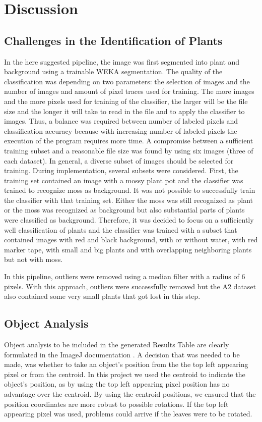 \documentclass[paper=A4,bibliography=totocnumbered]{scrartcl}
\begin{document}
\section{Discussion}
\subsection{Challenges in the Identification of Plants}
In the here suggested pipeline, the image was first segmented into plant and background using a trainable WEKA segmentation. The quality of the classification was depending on two parameters: the selection of images and the number of images and amount of pixel traces used for training. The more images and the more pixels used for training of the classifier, the larger will be the file size and the longer it will take to read in the file and to apply the classifier to images. Thus, a balance was required between number of labeled pixels and classification accuracy because with increasing number of labeled pixels the execution of the program requires more time. A compromise between a sufficient training subset and a reasonable file size was found by using six images (three of each dataset). In general, a diverse subset of images should be selected for training. During implementation, several subsets were considered. First, the training set contained an image with a mossy plant pot and the classifier was trained to recognize moss as background. It was not possible to successfully train the classifier with that training set. Either the moss was still recognized as plant or the moss was recognized as background but also substantial parts of plants were classified as background. Therefore, it was decided to focus on a sufficiently well classification of plants and the classifier was trained with a subset that contained images with red and black background, with or without water, with red marker tape, with small and big plants and with overlapping neighboring plants but not with moss.

In this pipeline, outliers were removed using a median filter with a radius of 6 pixels. With this approach, outliers were successfully removed but the A2 dataset also contained some very small plants that got lost in this step. 

\subsection{Object Analysis}
Object analysis to be included in the generated Results Table are clearly formulated in the ImageJ documentation \citep{Ferreira.2012}. A decision that was needed to be made, was whether to take an object's position from the the top left appearing pixel or from the centroid. In this project we used the centroid to indicate the object's position, as by using the top left appearing pixel position has no advantage over the centroid. By using the centroid positions, we ensured that the position coordinates are more robust to possible rotations. If the top left appearing pixel was used, problems could arrive if the leaves were to be rotated. 
\end{document}
